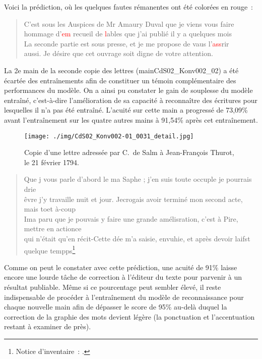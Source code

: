 \documentclass[a4paper,12pt,twoside]{book}
\begin{document}
				Voici la prédiction, où les quelques fautes rémanentes ont été colorées en rouge~:
				
				\begin{quote}
					\textsf{C'est sous les Auspices de Mr Amaury Duval que je viens vous faire\\
					hommage d'\textcolor{red}{em} recueil de \textcolor{red}{l}ables que j'ai publié il y a quelques mois\\
					La seconde partie est sous presse, et je me propose de vaus l'\textcolor{red}{ass}rir\\
					aussi. Je désire que cet ouvrage soit digne de votre attention.}
				\end{quote}
							
				La 2e main de la seconde copie des lettres (\textsf{mainCdS02\_Konv002\_02}) a été écartée des entraînements afin de constituer un témoin complémentaire des performances du modèle. On a ainsi pu constater le gain de souplesse du modèle entraîné, c'est-à-dire l'amélioration de sa capacité à reconnaître des écritures pour lesquelles il n'a pas été entraîné. L'acuité sur cette main a progressé de 73,09\% avant l'entraînement sur les quatre autres mains à 91,54\% après cet entraînement.
				
				\begin{figure}[!h]
					\centering
					\texttt{[image: ./img/CdS02\_Konv002-01\_0031\_detail.jpg]}%
					\caption{Copie d'une lettre adressée par C.~de Salm à Jean-François Thurot, le 21 février 1794.}%
					\label{}%
				\end{figure}
				
				\begin{quote}
					\scriptsize \textsf{Que j vous parle d'abord le ma Saphe ; j'en suis toute occuple je pourrais drie\\
					êvre j'y travaille nuit et jour. Jecrogais avoir terminé mon second acte, mais toet à-coup\\
					Ima paru que je pouvais y faire une grande amélisration, c'est à Pire, mettre en actionce\\
					qui n'était qu'en récit-Cette dée m'a saisie, envuhie, et après devoir laifst quelque tempps}\footnote{Notice d'inventaire~: \cite{CdS02031032}.}
				\end{quote}
			
				Comme on peut le constater avec cette prédiction, une acuité de 91\% laisse encore une lourde tâche de correction à l'éditeur du texte pour parvenir à un résultat publiable. Même si ce pourcentage peut sembler élevé, il reste indispensable de procéder à l'entraînement du modèle de reconnaissance pour chaque nouvelle main afin de dépasser le score de 95\% au-delà duquel la correction de la graphie des mots devient légère (la ponctuation et l'accentuation restant à examiner de près).
			
\end{document}
